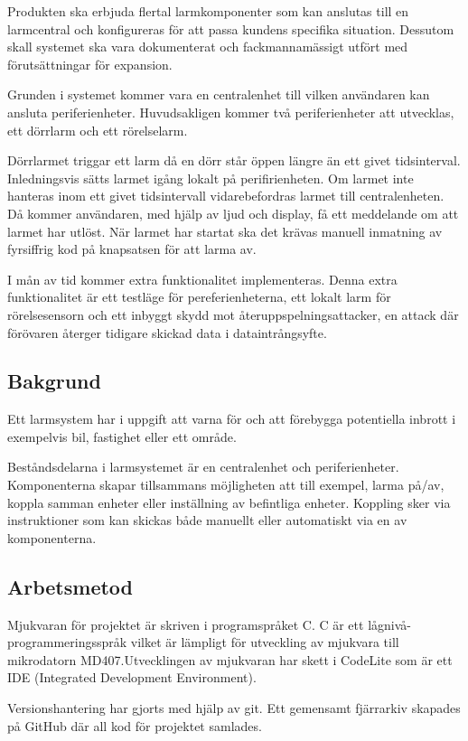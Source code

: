 \documentclass[a4paper]{article}
\begin{document}
Produkten ska erbjuda flertal larmkomponenter som kan anslutas till en larmcentral och konfigureras för att passa kundens specifika situation. Dessutom skall systemet ska vara dokumenterat och fackmannamässigt utfört med förutsättningar för expansion.

Grunden i systemet kommer vara en centralenhet till vilken användaren kan ansluta periferienheter. Huvudsakligen kommer två periferienheter att utvecklas, ett dörrlarm och ett rörelselarm.

Dörrlarmet triggar ett larm då en dörr står öppen längre än ett givet tidsinterval. Inledningsvis sätts larmet igång lokalt på perifirienheten. Om larmet inte hanteras inom ett givet tidsintervall vidarebefordras larmet till centralenheten. Då kommer användaren, med hjälp av ljud och display, få ett meddelande om att larmet har utlöst. När larmet har startat ska det krävas manuell inmatning av fyrsiffrig kod på knapsatsen för att larma av.

I mån av tid kommer extra funktionalitet implementeras. Denna extra funktionalitet är ett testläge för pereferienheterna, ett lokalt larm för rörelsesensorn och ett inbyggt skydd mot återuppspelningsattacker, en attack där förövaren återger tidigare skickad data i dataintrångsyfte.

\subsection{Bakgrund}
Ett larmsystem har i uppgift att varna för och att förebygga potentiella inbrott i exempelvis bil, fastighet eller ett område.

Beståndsdelarna i larmsystemet är en centralenhet och periferienheter. Komponenterna skapar tillsammans möjligheten att till exempel, larma på/av, koppla samman enheter eller inställning av befintliga enheter. Koppling sker via instruktioner som kan skickas både manuellt eller automatiskt via en av komponenterna.

\subsection{Arbetsmetod}

Mjukvaran för projektet är skriven i programspråket C. C är ett lågnivå-programmeringsspråk vilket är lämpligt för utveckling av mjukvara till mikrodatorn MD407.Utvecklingen av mjukvaran har skett i CodeLite som är ett IDE (Integrated Development Environment).

Versionshantering har gjorts med hjälp av git. Ett gemensamt fjärrarkiv skapades på GitHub där all kod för projektet samlades.
\end{document}
